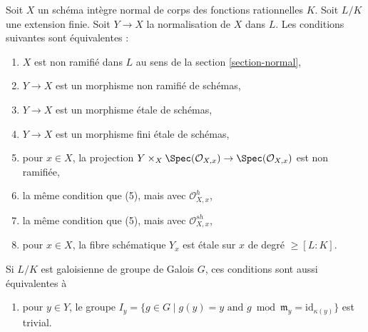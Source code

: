 \begin{lemma}
\label{lemma-unramified}
Soit $X$ un schéma intègre normal de corps des fonctions rationnelles $K$.
Soit $L/K$ une extension finie. Soit $Y \to X$ la normalisation
de $X$ dans $L$. Les conditions suivantes sont équivalentes :
\begin{enumerate}
\item $X$ est non ramifié dans $L$ au sens de la section \ref{section-normal},
\item $Y \to X$ est un morphisme non ramifié de schémas,
\item $Y \to X$ est un morphisme étale de schémas,
\item $Y \to X$ est un morphisme fini étale de schémas,
\item pour $x \in X$, la projection
$Y \times_X \Spec(\mathcal{O}_{X, x}) \to \Spec(\mathcal{O}_{X, x})$
est non ramifiée,
\item la même condition que (5), mais avec $\mathcal{O}_{X, x}^h$,
\item la même condition que (5), mais avec $\mathcal{O}_{X, x}^{sh}$,
\item pour $x \in X$, la fibre schématique $Y_x$
est étale sur $x$ de degré $\geq [L : K]$.
\end{enumerate}
Si $L/K$ est galoisienne de groupe de Galois $G$, ces conditions sont aussi
équivalentes à
\begin{enumerate}
\item[(9)] pour $y \in Y$, le groupe
$I_y = \{g \in G \mid g(y) = y\text{ and }
g \bmod \mathfrak m_y = \text{id}_{\kappa(y)}\}$ est trivial.
\end{enumerate}
\end{lemma}

